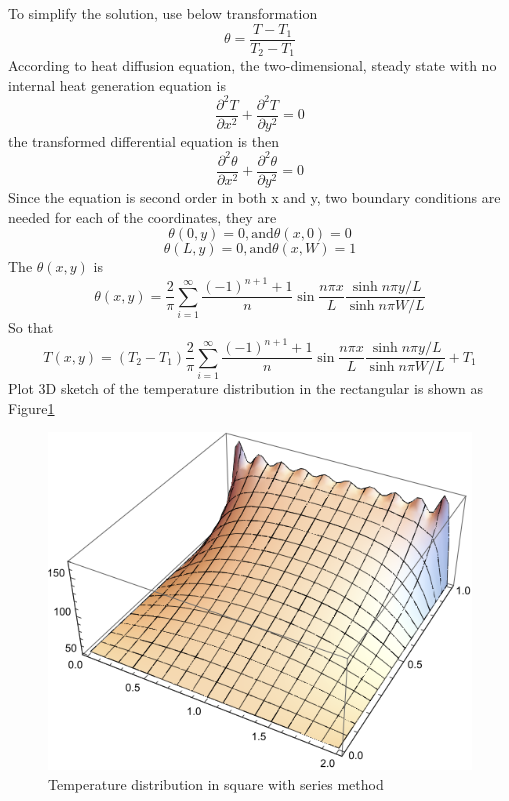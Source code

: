 \begin{solution}
To simplify the solution, use below transformation
$$\theta=\frac{T-T_1}{T_2-T_1}$$
According to heat diffusion equation, the two-dimensional, steady state with no internal heat generation equation is 
$$\frac{\partial^2 T}{\partial x^2}+\frac{\partial^2 T}{\partial y^2}=0$$
the transformed differential equation is then
$$\frac{\partial^2 \theta}{\partial x^2}+\frac{\partial^2 \theta}{\partial y^2}=0$$
Since the equation is second order in both x and y, two boundary conditions are needed for each of the coordinates, they are
$$\theta(0,y)=0,\text{and}  \theta(x,0)=0$$
$$\theta(L,y)=0,\text{and}  \theta(x,W)=1$$
The $\theta(x,y)$ is
$$\theta(x,y)=\frac{2}{\pi}\sum\limits_{i=1}^\infty 
\frac{(-1)^{n+1}+1}{n}\sin{\frac{n\pi x}{L}}
\frac{\sinh{n\pi y/L}}{\sinh{n\pi W/L}}
$$
So that 
$$T(x,y)=(T_2-T_1)\frac{2}{\pi}\sum\limits_{i=1}^\infty 
\frac{(-1)^{n+1}+1}{n}\sin{\frac{n\pi x}{L}}
\frac{\sinh{n\pi y/L}}{\sinh{n\pi W/L}}+T_1
$$
Plot 3D sketch of the temperature distribution in the rectangular is shown as Figure\ref{fig:3:2}
\begin{figure}[h!]
  \centering
    \includegraphics[scale=0.8]{figures/ch3/2}
    \caption{Temperature distribution in square with series method}
    \label{fig:3:2}
\end{figure}


\end{solution}
